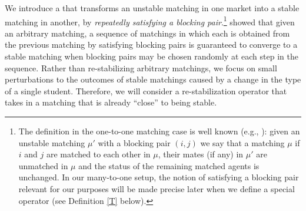 \documentclass[12pt, fullpage]{amsart}
\theoremstyle{definition}
\theoremstyle{definition}
\theoremstyle{definition}
\begin{document}
\begin{bibunit}[econometrica]
We introduce a  that transforms an unstable matching in one market into a stable matching in another, by \textit{repeatedly satisfying a blocking pair}.\footnote{The definition in the one-to-one matching case is well known (e.g., \cite{Blum/Roth/Rothblum:1997:JET}): given an unstable matching $\mu'$ with a blocking pair $(i,j)$ we say that a matching $\mu$  if $i$ and $j$ are matched to each other in $\mu$, their mates (if any) in $\mu'$ are unmatched in $\mu$ and the status of the remaining matched agents is unchanged. In our many-to-one setup, the notion of satisfying a blocking pair relevant for our purposes will be made precise later when we define a special operator (see Definition \ref{T} below). } \citet{Roth/Vandevate:1990:Ecta} showed that given an arbitrary matching, a sequence of matchings in which each is obtained from the previous matching by satisfying blocking pairs is guaranteed to converge to a stable matching when blocking pairs may be chosen randomly at each step in the sequence.  Rather than re-stabilizing arbitrary matchings, we focus on small perturbations to the outcomes of stable matchings caused by a change in the type of a single student. Therefore, we will consider a re-stabilization operator that takes in a matching that is already ``close'' to being stable.


\end{bibunit}
\end{document}
